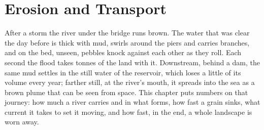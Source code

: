 \chapter{Erosion and Transport}\label{ch:b1:erosion-transport}

After a storm the river under the bridge runs brown. The water that was clear
the day before is thick with mud, swirls around the piers and carries
branches, and on the bed, unseen, pebbles knock against each other as they
roll. Each second the flood takes tonnes of the land with it. Downstream,
behind a dam, the same mud settles in the still water of the reservoir, which
loses a little of its volume every year; farther still, at the river's mouth,
it spreads into the sea as a brown plume that can be seen from space. This
chapter puts numbers on that journey: how much a river carries and in what
forms, how fast a grain sinks, what current it takes to set it moving, and how
fast, in the end, a whole landscape is worn away.

